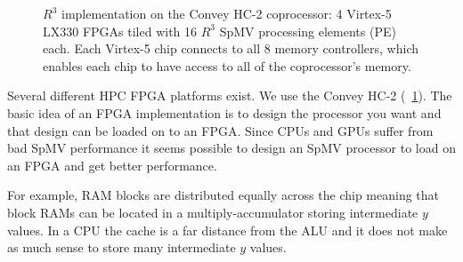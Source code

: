\begin{figure}
\centering
{}
\caption[High-level diagram of the Convey HC-2]{$R^3$ implementation on the Convey HC-2 coprocessor: 4 Virtex-5 LX330 FPGAs tiled with 16 $R^3$ SpMV processing elements (PE) each. Each Virtex-5 chip connects to all 8 memory controllers, which enables each chip to have access to all of the coprocessor's memory.}
\label{fig:highlevel1}
\end{figure}
Several different HPC FPGA platforms exist. We use the Convey HC-2 (\figurename~\ref{fig:highlevel1}). The basic idea of an FPGA implementation is to design the processor you want and that design can be loaded on to an FPGA. Since CPUs and GPUs suffer from bad SpMV performance it seems possible to design an SpMV processor to load on an FPGA and get better performance.
\par For example, RAM blocks are distributed equally across the chip meaning that block RAMs can be located in a multiply-accumulator storing intermediate $y$ values. In a CPU the cache is a far distance from the ALU and it does not make as much sense to store many intermediate $y$ values.
